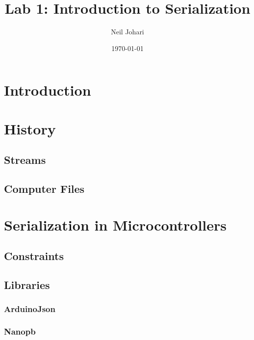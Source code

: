 \documentclass[12pt, letterpaper]{article}
\title{Lab 1: Introduction to Serialization}
\author{Neil Johari}
\date{\today}
\begin{document}
\maketitle

\section{Introduction}


\section{History}


\subsection{Streams}
\subsection{Computer Files}

\section{Serialization in Microcontrollers}
\subsection{Constraints}
\subsection{Libraries}
\subsubsection{ArduinoJson}
\subsubsection{Nanopb}



\end{document}
